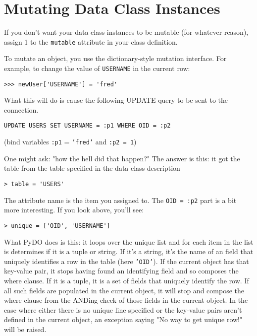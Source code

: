 \documentclass[titlepage]{manual}
\begin{document}
\section{Mutating Data Class Instances}

If you don't want your data class instances to be mutable (for
whatever reason), assign 1 to the \texttt{mutable} attribute in your class
definition.

To mutate an object, you use the dictionary-style mutation interface.
For example, to change the value of \texttt{USERNAME} in the current row:
\begin{verbatim}
>>> newUser['USERNAME'] = 'fred'
\end{verbatim}

What this will do is cause the following UPDATE query to be sent to the
connection.

\begin{verbatim}
UPDATE USERS SET USERNAME = :p1 WHERE OID = :p2
\end{verbatim}
(bind variables \texttt{:p1} = \texttt{'fred'} and \texttt{:p2 = 1})

One might ask: "how the hell did that happen?"  The answer is this:
it got the table from the table specified in the data class
description

\begin{verbatim}
> table = 'USERS'
\end{verbatim}

The attribute name is the item you assigned to.  The \texttt{OID =
:p2} part is a bit more interesting.  If you look above, you'll see:

\begin{verbatim}
> unique = ['OID', 'USERNAME']
\end{verbatim}

What PyDO does is this: it loops over the unique list and for each
item in the list is determines if it is a tuple or string.  If it's a
string, it's the name of an field that uniquely identifies a row in
the table (here \texttt{'OID'}).  If the current object has that
key-value pair, it stops having found an identifying field and so
composes the where clause.  If it is a tuple, it is a set of fields
that uniquely identify the row.  If all such fields are populated in
the current object, it will stop and compose the where clause from the
ANDing check of those fields in the current object.  In the case where
either there is no unique line specified or the key-value pairs aren't
defined in the current object, an exception saying "No way to get
unique row!" will be raised.
\end{document}

